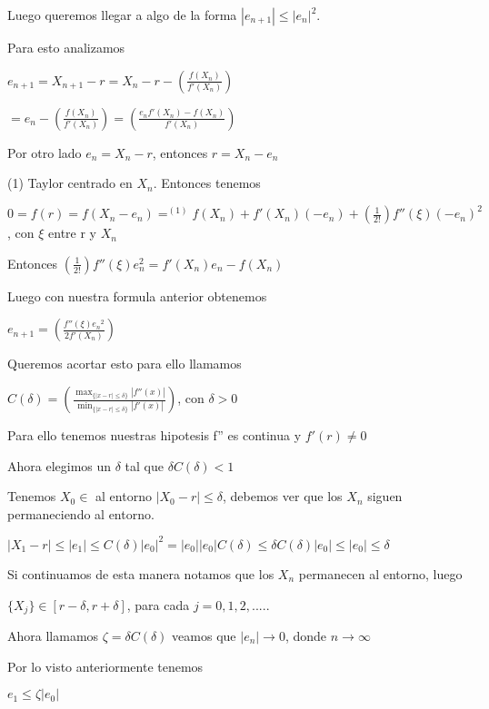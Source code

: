 \documentclass{article}
\begin{document}
 Luego queremos llegar a algo de la forma $ \left| e_{n+1}  \right | \leq \left| e_{n}  \right |^2 $.

 Para esto analizamos

 $ e_{n+1} = X_{n+1}-r = X_n - r - \left( \displaystyle\frac{f(X_n)}{f'(X_n)} \right) $

 $ = e_n - \left( \displaystyle\frac{f(X_n)}{f'(X_n)} \right) = \left( \displaystyle\frac{e_nf'(X_n)-f(X_n)}{f'(X_n)} \right) $ 

 \vspace{5mm}

 Por otro lado $ e_n = X_n -r $, entonces $ r = X_n - e_n $

 (1) Taylor centrado en $ X_n $.
 Entonces tenemos

 $ 0 = f(r) = f(X_n-e_n) =^{(1)} f(X_n) + f'(X_n)(-e_n) + \left( \displaystyle\frac{1}{2!} \right)f''(\xi)(-e_n)^2 $, con $\xi$ entre r y $X_n$

 Entonces $ \left( \displaystyle\frac{1}{2!} \right)f''(\xi)e_n^2 = f'(X_n)e_n -f(X_n)  $

 Luego con nuestra formula anterior obtenemos

 $ e_{n+1} = \left( \displaystyle\frac{f''(\xi){e_n}^2}{2f'(X_n)} \right) $

 Queremos acortar esto para ello llamamos

 $C(\delta) = \left( \displaystyle\frac{\max_{\{|x-r| \leq \delta\}} |f''(x)|}{\min_{\{|x-r| \leq \delta\}}|f'(x)|} \right)$, con $ \delta > 0 $

 Para ello tenemos nuestras hipotesis f'' es continua y $f'(r) \not= 0 $

 Ahora elegimos un $ \delta  $ tal que $ \delta C(\delta) < 1 $

 Tenemos $ X_0 \in$ al entorno  $|X_0 - r| \leq \delta $, debemos ver que los $X_n$ siguen permaneciendo al entorno.

 $ |X_1-r| \leq |e_1| \leq C(\delta)|e_0|^2 = |e_0||e_0|C(\delta) \leq \delta C(\delta)|e_0| \leq |e_0| \leq \delta $

 Si continuamos de esta manera notamos que los $X_n$ permanecen al entorno, luego

 $ \{X_j\} \in [r-\delta, r+\delta]$, para cada $j=0,1,2,.....$

 Ahora llamamos $\zeta = \delta C(\delta)$ veamos que $|e_n| \rightarrow 0$, donde $ n \rightarrow \infty$

 Por lo visto anteriormente tenemos

 $e_1 \leq \zeta|e_0| $
\end{document}

